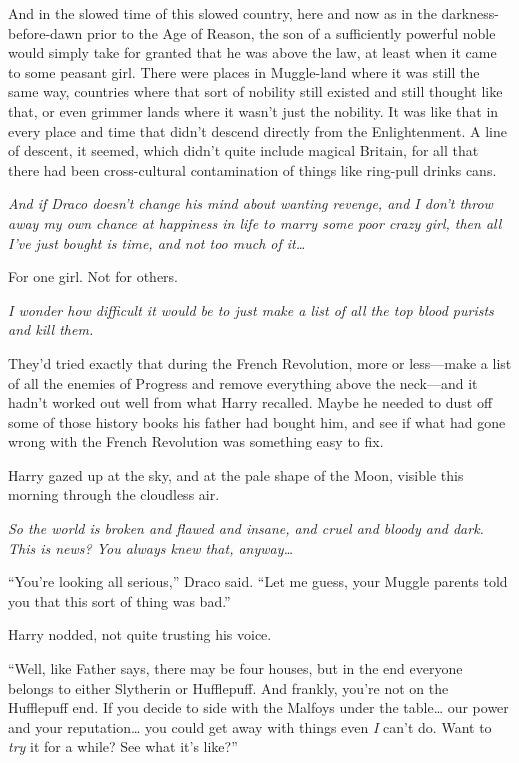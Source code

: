 And in the slowed time of this slowed country, here and now as in the
darkness-before-dawn prior to the Age of Reason, the son of a
sufficiently powerful noble would simply take for granted that he was
above the law, at least when it came to some peasant girl. There were
places in Muggle-land where it was still the same way, countries where
that sort of nobility still existed and still thought like that, or even
grimmer lands where it wasn't just the nobility. It was like that in
every place and time that didn't descend directly from the
Enlightenment. A line of descent, it seemed, which didn't quite include
magical Britain, for all that there had been cross-cultural
contamination of things like ring-pull drinks cans.

\emph{And if Draco doesn't change his mind about wanting revenge, and I
don't throw away my own chance at happiness in life to marry some poor
crazy girl, then all I've just bought is time, and not too much of
it\ldots{}}

For one girl. Not for others.

\emph{I wonder how difficult it would be to just make a list of all the
top blood purists and kill them.}

They'd tried exactly that during the French Revolution, more or
less---make a list of all the enemies of Progress and remove everything
above the neck---and it hadn't worked out well from what Harry recalled.
Maybe he needed to dust off some of those history books his father had
bought him, and see if what had gone wrong with the French Revolution
was something easy to fix.

Harry gazed up at the sky, and at the pale shape of the Moon, visible
this morning through the cloudless air.

\emph{So the world is broken and flawed and insane, and cruel and bloody
and dark. This is news? You always knew that, anyway\ldots{}}

``You're looking all serious,'' Draco said. ``Let me guess, your Muggle
parents told you that this sort of thing was bad.''

Harry nodded, not quite trusting his voice.

``Well, like Father says, there may be four houses, but in the end
everyone belongs to either Slytherin or Hufflepuff. And frankly, you're
not on the Hufflepuff end. If you decide to side with the Malfoys under
the table\ldots{} our power and your reputation\ldots{} you could get
away with things even \emph{I} can't do. Want to \emph{try} it for a
while? See what it's like?''

